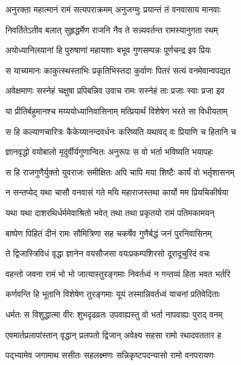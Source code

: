
\twolineshloka
{अनुरक्ता महात्मानं रामं सत्यपराक्रमम्}
{अनुजग्मुः प्रयान्तं तं वनवासाय मानवाः} %

\twolineshloka
{निवर्तितेऽतीव बलात् सुहृद्धर्मेण राजनि}
{नैव ते सन्न्यवर्तन्त रामस्यानुगता रथम्} %

\twolineshloka
{अयोध्यानिलयानां हि पुरुषाणां महायशाः}
{बभूव गुणसम्पन्नः पूर्णचन्द्र इव प्रियः} %

\twolineshloka
{स याच्यमानः काकुत्स्थस्ताभिः प्रकृतिभिस्तदा}
{कुर्वाणः पितरं सत्यं वनमेवान्वपद्यत} %

\twolineshloka
{अवेक्षमाणः सस्नेहं चक्षुषा प्रपिबन्निव}
{उवाच रामः सस्नेहं ताः प्रजाः स्वाः प्रजा इव} %

\twolineshloka
{या प्रीतिर्बहुमानश्च मय्ययोध्यानिवासिनाम्}
{मत्प्रियार्थं विशेषेण भरते सा विधीयताम्} %

\twolineshloka
{स हि कल्याणचारित्रः कैकेय्यानन्दवर्धनः}
{करिष्यति यथावद् वः प्रियाणि च हितानि च} %

\twolineshloka
{ज्ञानवृद्धो वयोबालो मृदुर्वीर्यगुणान्वितः}
{अनुरूपः स वो भर्ता भविष्यति भयापहः} %

\twolineshloka
{स हि राजगुणैर्युक्तो युवराजः समीक्षितः}
{अपि चापि मया शिष्टैः कार्यं वो भर्तृशासनम्} %

\twolineshloka
{न सन्तप्येद् यथा चासौ वनवासं गते मयि}
{महाराजस्तथा कार्यो मम प्रियचिकीर्षया} %

\twolineshloka
{यथा यथा दाशरथिर्धर्ममेवाश्रितो भवेत्}
{तथा तथा प्रकृतयो रामं पतिमकामयन्} %

\twolineshloka
{बाष्पेण पिहितं दीनं रामः सौमित्रिणा सह}
{चकर्षेव गुणैर्बद्धं जनं पुरनिवासिनम्} %

\twolineshloka
{ते द्विजास्त्रिविधं वृद्धा ज्ञानेन वयसौजसा}
{वयःप्रकम्पशिरसो दूरादूचुरिदं वचः} %

\twolineshloka
{वहन्तो जवना रामं भो भो जात्यास्तुरङ्गमाः}
{निवर्तध्वं न गन्तव्यं हिता भवत भर्तरि} %

\twolineshloka
{कर्णवन्ति हि भूतानि विशेषेण तुरङ्गमाः}
{यूयं तस्मान्निवर्तध्वं याचनां प्रतिवेदिताः} %

\twolineshloka
{धर्मतः स विशुद्धात्मा वीरः शुभदृढव्रतः}
{उपवाह्यस्तु वो भर्ता नापवाह्यः पुराद् वनम्} %

\twolineshloka
{एवमार्तप्रलापांस्तान् वृद्धान् प्रलपतो द्विजान्}
{अवेक्ष्य सहसा रामो रथादवततार ह} %

\twolineshloka
{पद्भ्यामेव जगामाथ ससीतः सहलक्ष्मणः}
{सन्निकृष्टपदन्यासो रामो वनपरायणः} %

